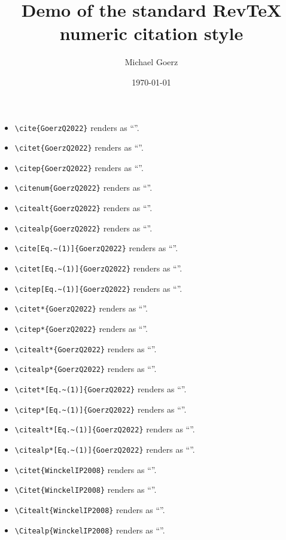 \documentclass[aps,pra,onecolumn,noshowpacs,superscriptaddress,preprintnumbers,%
kamsmath,amssymb,notitlepage,letterpaper]{revtex4-2}
\def\Author{Michael Goerz}
\def\Title{Demo of the standard RevTeX numeric citation style}
\begin{document}
\title{\Title}
\author{\Author}
\date{\today}

\maketitle


\begin{itemize}
  \item \verb|\cite{GoerzQ2022}| renders as ``\cite{GoerzQ2022}''.
  \item \verb|\citet{GoerzQ2022}| renders as ``\citet{GoerzQ2022}''.
  \item \verb|\citep{GoerzQ2022}| renders as ``\citep{GoerzQ2022}''.
  \item \verb|\citenum{GoerzQ2022}| renders as ``''.
  \item \verb|\citealt{GoerzQ2022}| renders as ``\citealt{GoerzQ2022}''.
  \item \verb|\citealp{GoerzQ2022}| renders as ``\citealp{GoerzQ2022}''.
  \item \verb|\cite[Eq.~(1)]{GoerzQ2022}| renders as ``\cite[Eq.~(1)]{GoerzQ2022}''.
  \item \verb|\citet[Eq.~(1)]{GoerzQ2022}| renders as ``\citet[Eq.~(1)]{GoerzQ2022}''.
  \item \verb|\citep[Eq.~(1)]{GoerzQ2022}| renders as ``\citep[Eq.~(1)]{GoerzQ2022}''.
  \item \verb|\citet*{GoerzQ2022}| renders as ``\citet*{GoerzQ2022}''.
  \item \verb|\citep*{GoerzQ2022}| renders as ``\citep*{GoerzQ2022}''.
  \item \verb|\citealt*{GoerzQ2022}| renders as ``\citealt*{GoerzQ2022}''.
  \item \verb|\citealp*{GoerzQ2022}| renders as ``\citealp*{GoerzQ2022}''.
  \item \verb|\citet*[Eq.~(1)]{GoerzQ2022}| renders as ``\citet*[Eq.~(1)]{GoerzQ2022}''.
  \item \verb|\citep*[Eq.~(1)]{GoerzQ2022}| renders as ``\citep*[Eq.~(1)]{GoerzQ2022}''.
  \item \verb|\citealt*[Eq.~(1)]{GoerzQ2022}| renders as ``\citealt*[Eq.~(1)]{GoerzQ2022}''.
  \item \verb|\citealp*[Eq.~(1)]{GoerzQ2022}| renders as ``\citealp*[Eq.~(1)]{GoerzQ2022}''.
  \item \verb|\citet{WinckelIP2008}| renders as ``\citet{WinckelIP2008}''.
  \item \verb|\Citet{WinckelIP2008}| renders as ``''.
  \item \verb|\Citealt{WinckelIP2008}| renders as ``''.
  \item \verb|\Citealp{WinckelIP2008}| renders as ``''.
\end{itemize}



\end{document}
